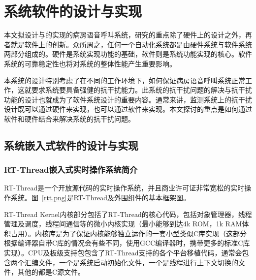 
\chapter{系统软件的设计与实现}
本文拟设计与的实现的病房语音呼叫系统，研究的重点除了硬件上的设计之外，再者就是软件上的创新。众所周之，任何一个自动化系统都是由硬件系统与软件系统两部分组成的。硬件是系统实现功能的基础，软件则是系统功能实现的核心。软件系统的可靠稳定性也将对系统的整体性能产生重要影响。

本系统的设计特别考虑了在不同的工作环境下，如何保证病房语音呼叫系统正常工作，这就要求系统要具备强健的抗干扰能力。此系统的抗干扰问题的解决与抗干扰功能的设计也就成为了软件系统设计的重要内容。通常来讲，监测系统上的抗干扰设计既可以通过硬件来实现，也可以通过软件来实现。本文探讨的重点是如何通过软件和硬件结合来解决系统的抗干扰问题。

\section{系统嵌入式软件的设计与实现}
\subsection{RT-Thread嵌入式实时操作系统简介}
RT-Thread是一个开放源代码的实时操作系统，并且商业许可证非常宽松的实时操作系统。图~\ref{rtt.png}是RT-Thread及外围组件的基本框架图。


RT-Thread Kernel内{\cf}核部{\cf}分包{\cf}括了{\cf}RT{\cf}-T{\cf}hr{\cf}ea{\cf}d的{\cf}核心{\cf}代码{\cf}，包{\cf}括对{\cf}象管{\cf}理器{\cf}，线{\cf}程管{\cf}理及{\cf}调度{\cf}，线{\cf}程间{\cf}通信{\cf}等的{\cf}微小{\cf}内核{\cf}实现{\cf}（最{\cf}小能{\cf}够到{\cf}达4{\cf}k {\cf}RO{\cf}M，{\cf}1k{\cf} R{\cf}AM{\cf}体积{\cf}占用{\cf}）。{\cf}内核{\cf}库是{\cf}为了{\cf}保证{\cf}内核{\cf}能够{\cf}独立{\cf}运作{\cf}的一{\cf}套小{\cf}型类{\cf}似C{\cf}库实{\cf}现（{\cf}这部{\cf}分根{\cf}据编{\cf}译器{\cf}自带{\cf}C库{\cf}的情{\cf}况会{\cf}有些{\cf}不同{\cf}，使{\cf}用G{\cf}CC{\cf}编译{\cf}器时{\cf}，携{\cf}带更{\cf}多的{\cf}标准{\cf}C库{\cf}实现{\cf}）。{\cf}CP{\cf}U及{\cf}板级{\cf}支持{\cf}包包{\cf}含了{\cf}RT{\cf}-T{\cf}hr{\cf}ea{\cf}d支{\cf}持的{\cf}各个{\cf}平台{\cf}移植{\cf}代码{\cf}，通{\cf}常会{\cf}包含{\cf}两个{\cf}汇编{\cf}文件{\cf}，一{\cf}个是{\cf}系统{\cf}启动{\cf}初始{\cf}化文{\cf}件，{\cf}一个{\cf}是线{\cf}程进{\cf}行上{\cf}下文{\cf}切换{\cf}的文{\cf}件，{\cf}其他{\cf}的都{\cf}是C{\cf}源文{\cf}件。

